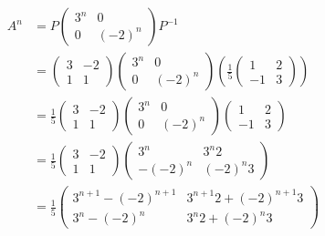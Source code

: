 \begin{align*}
  A^n
  &=
P
  \begin{pmatrix}
    3^n&0\\
    0&(-2)^n
  \end{pmatrix}
  P^{-1}\\
&=
  \begin{pmatrix}
   3&-2\\
    1&1    
  \end{pmatrix}
  \begin{pmatrix}
    3^n&0\\
    0&(-2)^n
  \end{pmatrix}
(  \frac{1}{5}
  \begin{pmatrix}
    1&2\\
    -1&3    
  \end{pmatrix}
)\\
  &=
  \frac{1}{5}
  \begin{pmatrix}
   3&-2\\
    1&1    
  \end{pmatrix}
  \begin{pmatrix}
    3^n&0\\
    0&(-2)^n
  \end{pmatrix}
  \begin{pmatrix}
    1&2\\
    -1&3    
  \end{pmatrix}
\\
  &=
  \frac{1}{5}
  \begin{pmatrix}
   3&-2\\
    1&1    
  \end{pmatrix}
  \begin{pmatrix}
    3^n&3^n2\\
    -(-2)^n&(-2)^n3
  \end{pmatrix}
\\
  &=
  \frac{1}{5}
  \begin{pmatrix}
   3^{n+1}-(-2)^{n+1}&3^{n+1}2+(-2)^{n+1}3\\
    3^n-(-2)^n&3^n2+(-2)^n3    
  \end{pmatrix}
\end{align*}

